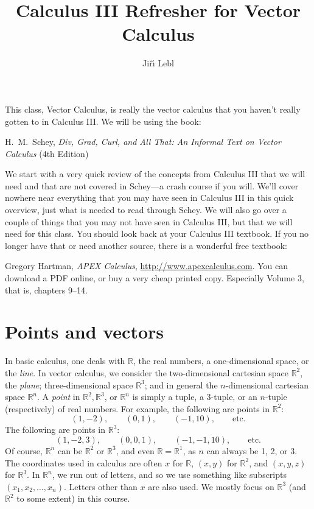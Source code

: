 \documentclass[12pt]{article}
\newcommand{\R}{{\mathbb{R}}}
\begin{document}
\title{Calculus III Refresher for Vector Calculus}
\author{Ji\v{r}\'\i{} Lebl}

\maketitle


This class, Vector Calculus, is really the vector calculus that you haven't
really gotten to in Calculus III.
We will be using the book:

\medskip

\noindent
H.\ M.\ Schey,
\emph{Div, Grad, Curl, and All That: An Informal Text on Vector Calculus} (4th Edition)

\medskip

We start with a very quick review of the concepts
from Calculus III that we will
need and that are not covered in Schey---a crash course if you will.
We'll cover nowhere near everything that you may have seen in Calculus III in this quick overview,
just what is needed to read through Schey.
We will also go over a couple of things that you may not have seen
in Calculus III, but that we will need for this class.
You should look back at your Calculus III textbook.  If you no longer have that or need another source, there is a wonderful free textbook:

\medskip

\noindent
Gregory Hartman, \emph{APEX Calculus}, \url{http://www.apexcalculus.com}.  You can download a PDF online, or buy a very cheap printed copy.  Especially Volume 3, that is, chapters 9--14.


\section{Points and vectors}

In basic calculus, one deals with $\R$, the real numbers, a one-dimensional space, or the \emph{line}.
In vector calculus, we consider the two-dimensional cartesian space $\R^2$,
the \emph{plane};
three-dimensional space $\R^3$; and in general the $n$-dimensional cartesian space $\R^n$.
A \emph{point} in $\R^2, \R^3$, or $\R^n$ is simply a tuple,
a 3-tuple, or an $n$-tuple (respectively) of real numbers.
For example, the following are points in $\R^2$:
\[
(1,-2), \qquad (0,1), \qquad (-1,10), \qquad \text{etc.}
\]
The following are points in $\R^3$:
\[
(1,-2,3), \qquad (0,0,1), \qquad (-1,-1,10), \qquad \text{etc.}
\]
Of course, $\R^n$ can be $\R^2$ or $\R^3$, and even $\R = \R^1$, as $n$ can always be
1, 2, or 3.
The coordinates used in calculus are often $x$ for $\R$, $(x,y)$ for $\R^2$, and $(x,y,z)$
for $\R^3$.
In $\R^n$, we run out of letters, and so we use something like
subscripts $(x_1,x_2,\ldots,x_n)$.  Letters other than $x$ are also used.
We mostly focus on $\R^3$ (and $\R^2$ to some extent) in this course.
\end{document}
